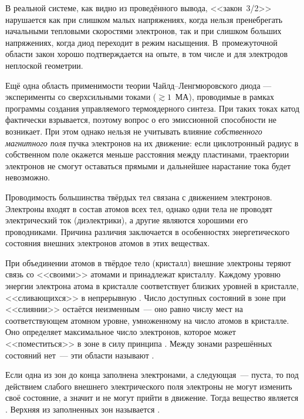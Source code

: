 В реальной системе, как видно из проведённого вывода, <<закон~3/2>>
нарушается как при слишком малых напряжениях, когда нельзя пренебрегать
начальными тепловыми скоростями электронов, так и при слишком больших
напряжениях, когда диод переходит в режим насыщения. В~промежуточной
области закон хорошо подтверждается на опыте, в том числе и для
электродов неплоской геометрии.

\begin{lab:note}
Ещё одна область применимости теории Чайлд--Ленгмюровского диода ---
эксперименты со сверхсильными токами ($\gtrsim 1$~МА),
проводимые в рамках программы создания управляемого
термоядерного синтеза. При таких токах катод фактически взрывается, поэтому
вопрос о его эмиссионной способности не возникает. При этом однако нельзя
не учитывать влияние \emph{собственного магнитного поля} пучка электронов
на их движение: если циклотронный радиус в собственном поле окажется
меньше расстояния между пластинами, траектории электронов не смогут
оставаться прямыми и дальнейшее нарастание тока будет невозможно.
\end{lab:note}



Проводимость большинства твёрдых тел связана с движением электронов. Электроны
входят в состав атомов всех тел, однако одни тела не проводят электрический ток
(диэлектрики), а другие являются хорошими его проводниками. Причина различия
заключается в особенностях энергетического состояния внешних электронов атомов в
этих веществах.



При объединении атомов в твёрдое тело (кристалл) внешние электроны теряют связь
со <<своими>> атомами и принадлежат  кристаллу.
Каждому уровню энергии электрона  атома в кристалле
соответствует  близких уровней в кристалле,
<<сливающихся>> в непрерывную .
Число доступных состояний в зоне при <<слиянии>> остаётся неизменным~--- оно
равно числу мест на соответствующем атомном уровне,
умноженному на число атомов в кристалле. Оно определяет максимальное число
электронов, которое может <<поместиться>> в зоне в силу принципа
. Между зонами разрешённых состояний нет~---
эти области называют .

Если одна из зон до конца заполнена электронами, а следующая~---
пуста, то под действием слабого внешнего электрического поля
электроны не могут изменить своё состояние, а значит и не могут
прийти в движение. Тогда вещество является .
Верхняя из заполненных зон называется .

